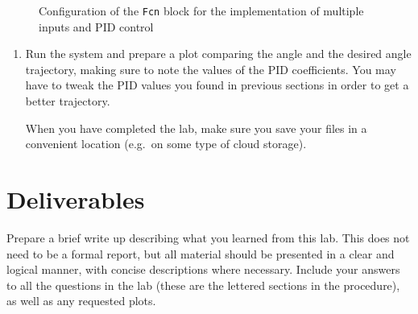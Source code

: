 \begin{enumerate}
\begin{figure}[H]
              \caption{Configuration of the \texttt{Fcn} block for the implementation of multiple inputs and PID control}\label{fig:switchConfig}
          \end{figure}%
          \newpage
          \begin{enumerate}
              \item Run the system and prepare a plot comparing the angle and the desired angle
                    trajectory, making sure to note the values of the PID coefficients. You may have to tweak the PID values you found in previous sections in order to get a better trajectory.

                    When you have completed the lab, make sure you save your files in a convenient location (e.g.\ on some type of cloud storage).
          \end{enumerate}
\end{enumerate}

\section{Deliverables}
Prepare a brief write up describing what you learned from this lab. This does not need to be a formal report, but all material should be presented in a clear and logical manner, with concise descriptions where necessary. Include your answers to all the questions in the lab (these are the lettered sections in the procedure), as well as any requested plots.

